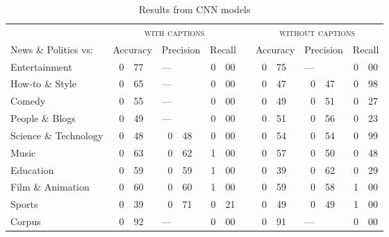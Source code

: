 \documentclass[letterpaper, 12pt]{article}
\begin{document}
\begin{table}[H]
  \centering
  \caption*{Results from CNN models}
  \begin{tabular}{lr@{.}lr@{.}lr@{.}lp{1em}r@{.}lr@{.}lr@{.}l}
    \toprule
    & \multicolumn{6}{c}{\textsc{with captions}} & & \multicolumn{6}{c}{\textsc{without captions}} \\
    \cmidrule{2-7} \cmidrule{9-14}
    News \& Politics vs: & \multicolumn{2}{r}{Accuracy} & \multicolumn{2}{r}{Precision} & \multicolumn{2}{r}{Recall} & & \multicolumn{2}{r}{Accuracy} & \multicolumn{2}{r}{Precision} & \multicolumn{2}{r}{Recall} \\
    \midrule
    Entertainment         & 0 & 77  & \multicolumn{2}{l}{---} & 0 & 00 & & 0 & 75 & \multicolumn{2}{l}{---} &	0 & 00 \\
    How-to \& Style       & 0 & 65	& \multicolumn{2}{l}{---}	& 0 & 00 & & 0 & 47 &	0 & 47                  &	0 & 98 \\
    Comedy                & 0 & 55	& \multicolumn{2}{l}{---}	& 0 & 00 & & 0 & 49 &	0 & 51                  &	0 & 27 \\
    People \& Blogs       & 0 & 49	& \multicolumn{2}{l}{---} &	0 & 00 & & 0 & 51 & 0	& 56                  &	0 & 23 \\
    Science \& Technology & 0 & 48	& 0 & 48                  &	0 & 00 & & 0 & 54 &	0 & 54                  &	0 & 99 \\
    Music                 & 0 & 63	& 0 & 62                  &	1 & 00 & & 0 & 57 &	0 & 50                  &	0 & 48 \\
    Education             & 0 & 59	& 0 & 59                  &	1 & 00 & & 0 & 39 &	0 & 62                  &	0 & 29 \\
    Film \& Animation     & 0 & 60	& 0 & 60                  &	1 & 00 & & 0 & 59 &	0 & 58                  &	1 & 00 \\
    Sports                & 0 & 39	& 0 & 71                  & 0 & 21 & & 0 & 49 &	0 & 49                  &	1 & 00 \\
    \bottomrule
    Corpus                & 0 & 92  & \multicolumn{2}{l}{---} & 0 & 00 & & 0 & 91 & \multicolumn{2}{l}{---} &	0 & 00 \\
  \end{tabular}
\end{table}
\end{document}
